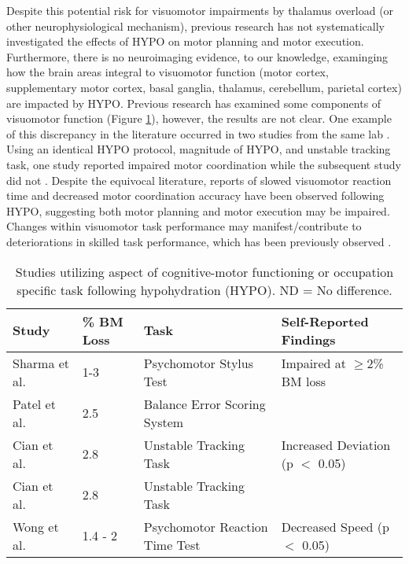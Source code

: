 Despite this potential risk for visuomotor impairments by thalamus overload (or other neurophysiological mechanism), previous research has not systematically investigated the effects of HYPO on motor planning and motor execution. Furthermore, there is no neuroimaging evidence, to our knowledge, examinging how the brain areas integral to visuomotor function (motor cortex, supplementary motor cortex, basal ganglia, thalamus, cerebellum, parietal cortex) are impacted by HYPO. Previous research has examined some components of visuomotor function (Figure \ref{tbl:m_c_studies}), however, the results are not clear. One example of this discrepancy in the literature occurred in two studies from the same lab \cite{cian_effects_2001,cian_influence_2000}. Using an identical HYPO protocol, magnitude of HYPO, and unstable tracking task, one study reported impaired motor coordination \cite{cian_influence_2000} while the subsequent study did not \cite{cian_effects_2001}. Despite the equivocal literature, reports of slowed visuomotor reaction time \cite{wong_effects_2014} and decreased motor coordination accuracy \cite{sharma_influence_1986,cian_influence_2000} have been observed following HYPO, suggesting both motor planning and motor execution may be impaired. Changes within visuomotor task performance may manifest/contribute to deteriorations in skilled task performance, which has been previously observed \cite{baker_progressive_2007,smith_effect_2012,nuccio_fluid_2017}.

\begin{table}
	\caption{Studies utilizing aspect of cognitive-motor functioning or occupation specific task following hypohydration (HYPO). ND = No difference.}
	\centering
	\begin{tabular}{llll} 
		\hline
		\footnotesize\textbf{Study} & \footnotesize\textbf{\% BM Loss} & \footnotesize\textbf{Task} & \footnotesize\textbf{Self-Reported Findings} \\
		\hline
		\footnotesize Sharma et al. \cite{sharma_influence_1986} & \footnotesize 1-3 & \footnotesize Psychomotor Stylus Test & \footnotesize Impaired at ${\ge}$2\% BM loss \\
		\footnotesize Patel et al. \cite{patel_neuropsychological_2007} & \footnotesize 2.5 & \footnotesize Balance Error Scoring System & \textemdash \\
		\footnotesize Cian et al. \cite{cian_influence_2000} & \footnotesize 2.8 & \footnotesize Unstable Tracking Task & \footnotesize Increased Deviation (p ${<}$ 0.05) \\
		\footnotesize Cian et al. \cite{cian_effects_2001} & \footnotesize 2.8 & \footnotesize Unstable Tracking Task & \textemdash \\
		\footnotesize Wong et al. \cite{wong_effects_2014} & \footnotesize 1.4 - 2 & \footnotesize Psychomotor Reaction Time Test & \footnotesize Decreased Speed (p ${<}$ 0.05) \\
		\hline		    
	\end{tabular}
	\label{tbl:m_c_studies}
\end{table}


